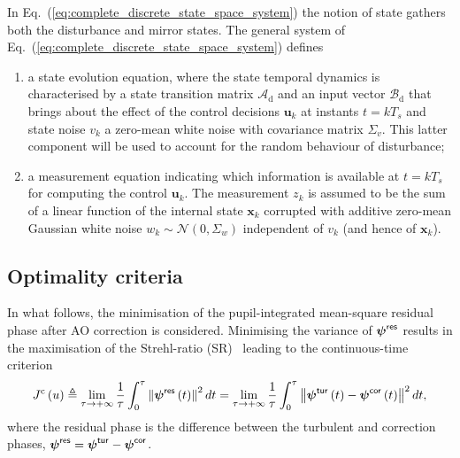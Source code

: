 \documentclass[a4paper,12pt]{article}
\newcommand{\0}{\mathsf{0}} %
\newcommand{\tur}{\mathsf{\tiny{tur}}}
\newcommand{\res}{\mathsf{\tiny{res}}}
\newcommand{\cor}{\mathsf{\tiny{cor}}}
\newcommand{\phivec}{{\boldsymbol{\psi}}}
\newcommand{\xvec}{{\mathbf{x}}}
\newcommand{\uvec}{{\mathbf{u}}}
\begin{document}
        In Eq.~(\ref{eq:complete_discrete_state_space_system}) the notion of
        state gathers both the disturbance and
        mirror states.
        The general system of
        Eq.~(\ref{eq:complete_discrete_state_space_system}) defines
         \begin{enumerate}
          \item a state evolution equation, where the state temporal
            dynamics is characterised by a state transition matrix
            $\mathcal{A}_{\mathrm{d}}$ and an input vector $\mathcal{B}_{\mathrm{d}}$ that
            brings about the effect of the control decisions $\uvec_k$ at
            instants $t=kT_s$ and state noise
            $v_k$ a zero-mean white noise with covariance 
            matrix $\Sigma_{v}$. This latter component will
            be used to account for the
            random behaviour of disturbance;
          \item a measurement equation indicating which information is
            available at $t=kT_s$ for computing the control $\uvec_k$. The
            measurement $z_k$ is assumed to be the sum of a linear
            function of the internal state $\xvec_k$  corrupted with additive zero-mean Gaussian white
            noise $w_k\sim
            \mathcal{N}(0,\Sigma_{w})$ independent of $v_k$ (and
            hence of $\xvec_k$).
        \end{enumerate}


\subsection{Optimality criteria }

   
        In what follows, the minimisation of the
        pupil-integrated mean-square residual phase after AO
        correction is considered. Minimising the variance of  $\phivec^{\res}$ %
        results in the maximisation of the Strehl-ratio
        (SR)~\cite{herrman92} leading to the continuous-time criterion   
	\begin{equation}\label{eq:Cont_criterion}
          J^{\mathrm{c}}\left(  u\right)
          \triangleq\lim_{\tau\rightarrow+\infty}\frac{1}
          {\tau}\int_{0}^{\tau}\left\Vert \phivec^{\res}\left(
              t\right)
          \right\Vert^{2}dt=\lim_{\tau\rightarrow+\infty}\frac{1}{\tau}\int_{0}^{\tau}\left\Vert\phivec^{\tur}\left( 
              t\right) -\phivec^{\cor}\left(  t\right)\right\Vert
          ^{2}dt,
	\end{equation}
	where the residual phase is the difference between the
        turbulent and correction phases, $\phivec^{\res} = \phivec^{\tur} -
        \phivec^{\cor}$. %
\end{document}

